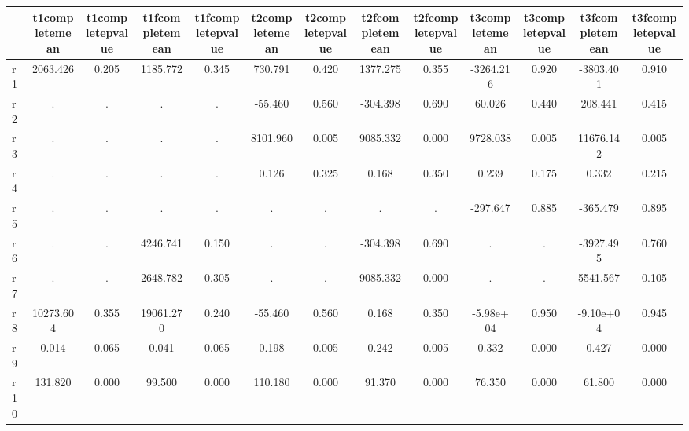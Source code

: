 \begin{table}[htbp]
\begin{tabular}{lcccccccccccc} \hline \hline
 & t1completemean  & t1completepvalue  & t1fcompletemean  & t1fcompletepvalue  & t2completemean  & t2completepvalue  & t2fcompletemean  & t2fcompletepvalue  & t3completemean  & t3completepvalue  & t3fcompletemean  & t3fcompletepvalue  \\  \hline 
r1 &  2063.426 &     0.205 &  1185.772 &     0.345 &   730.791 &     0.420 &  1377.275 &     0.355 & -3264.216 &     0.920 & -3803.401 &     0.910 \\  
r2 &         . &         . &         . &         . &   -55.460 &     0.560 &  -304.398 &     0.690 &    60.026 &     0.440 &   208.441 &     0.415 \\  
r3 &         . &         . &         . &         . &  8101.960 &     0.005 &  9085.332 &     0.000 &  9728.038 &     0.005 & 11676.142 &     0.005 \\  
r4 &         . &         . &         . &         . &     0.126 &     0.325 &     0.168 &     0.350 &     0.239 &     0.175 &     0.332 &     0.215 \\  
r5 &         . &         . &         . &         . &         . &         . &         . &         . &  -297.647 &     0.885 &  -365.479 &     0.895 \\  
r6 &         . &         . &  4246.741 &     0.150 &         . &         . &  -304.398 &     0.690 &         . &         . & -3927.495 &     0.760 \\  
r7 &         . &         . &  2648.782 &     0.305 &         . &         . &  9085.332 &     0.000 &         . &         . &  5541.567 &     0.105 \\  
r8 & 10273.604 &     0.355 & 19061.270 &     0.240 &   -55.460 &     0.560 &     0.168 &     0.350 & -5.98e+04 &     0.950 & -9.10e+04 &     0.945 \\  
r9 &     0.014 &     0.065 &     0.041 &     0.065 &     0.198 &     0.005 &     0.242 &     0.005 &     0.332 &     0.000 &     0.427 &     0.000 \\  
r10 &   131.820 &     0.000 &    99.500 &     0.000 &   110.180 &     0.000 &    91.370 &     0.000 &    76.350 &     0.000 &    61.800 &     0.000 \\  
\hline \hline \end{tabular}
\end{table}
